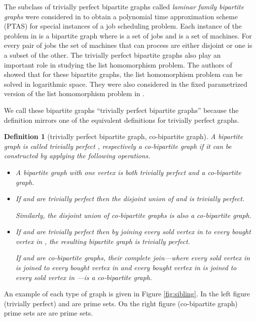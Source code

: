 \documentclass[letterpaper,11pt,abstracton]{scrartcl}
\newtheorem{dfn}[theorem]{Definition}
\begin{document}
The subclass of trivially perfect bipartite graphs called {\em laminar family bipartite graphs} were considered in \cite{MSW10} to obtain a
polynomial time approximation
scheme (PTAS) for special instances of a job scheduling problem. Each instance of the problem in \cite{MSW10} is a bipartite graph
 where  is a set of jobs and  is a set of machines. For every pair of jobs  the set of machines that can process
 are either disjoint or one is a subset of the other. The trivially perfect bipartite graphs also play an important role in
studying the list homomorphism problem. The authors of \cite{EKLT12} showed that for these
bipartite graphs, the list homomorphism problem can be
solved in logarithmic space. They were also considered in the fixed parametrized version of the list homomorphism problem
in \cite{CEM13}.

We call these bipartite graphs ``trivially perfect
bipartite graphs'' because the definition mirrors one of the equivalent
definitions for trivially perfect graphs.

\begin{dfn}[trivially perfect bipartite graph, co-bipartite graph]
  \label{def:tp}
  A bipartite graph  is called \emph{trivially perfect} , respectively
  a \emph{co-bipartite graph} if it can be constructed by applying the
  following operations.
  \begin{itemize}

  \item A bipartite graph with one vertex is both trivially perfect and a co-bipartite graph.
  \item If  and  are trivially perfect then the disjoint union of  and  is trivially perfect.

    Similarly, the disjoint union of co-bipartite graphs is also a co-bipartite graph.
  \item If  and  are trivially perfect then by joining
every sold vertex in  to every bought vertex in , the resulting bipartite graph is trivially
    perfect.

    If  and  are co-bipartite graphs, their \emph{complete} join---where every sold
    vertex in  is joined to every bought vertex in  and every bought vertex in  is
    joined to every sold vertex in ---is a
    co-bipartite graph.
  \end{itemize}
\end{dfn}

An example of each type of graph is given in Figure \ref{fig:sibling}. In the left figure (trivially perfect)  and  are prime sets.
On the right figure (co-bipartite graph) prime sets are  are prime
sets.
\end{document}
